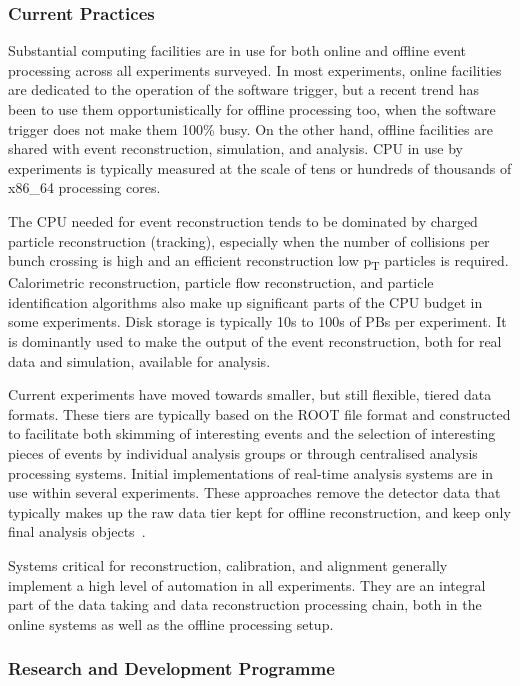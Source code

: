 \subsubsection*{Current Practices}

Substantial computing facilities are in use for both online and offline
event processing across all experiments surveyed. In most experiments,
online facilities are dedicated to the operation of the software
trigger, but a recent trend has been to use them opportunistically
for offline processing too, when the software trigger does not make them
100\% busy. On the other hand, offline facilities are shared with
event reconstruction, simulation, and analysis. CPU in use by
experiments is typically measured at the scale of tens or hundreds of
thousands of x86\_64 processing cores.

The CPU needed for event reconstruction tends to be dominated by charged
particle reconstruction (tracking), especially when the number of
collisions per bunch crossing is high and an efficient
reconstruction low p\textsubscript{T} particles is required.
Calorimetric reconstruction, particle flow reconstruction, and particle
identification algorithms also make up significant parts of the CPU
budget in some experiments. Disk storage is typically 10s to 100s of PBs
per experiment. It is dominantly used to make the output of the event
reconstruction, both for real data and simulation, available for
analysis.

Current experiments have moved towards smaller, but still
flexible, tiered data formats. These tiers are typically based on the
ROOT file format and constructed to
facilitate both skimming of interesting events and the selection of
interesting pieces of events by individual analysis groups or through
centralised analysis processing systems. Initial implementations of
real-time analysis systems are in use within several experiments. These
approaches remove the detector data that typically makes up the raw data
tier kept for offline reconstruction, and keep only final analysis
objects~\cite{Aaij2016,ATL-DAQ-PUB-2017-003,Khachatryan:2149625}.

Systems critical for reconstruction, calibration, and alignment
generally implement a high level of automation in all experiments.
They are an integral part of the data taking and data reconstruction processing chain, both in the online systems as well as the offline processing setup.

\subsubsection*{Research and Development Programme}

